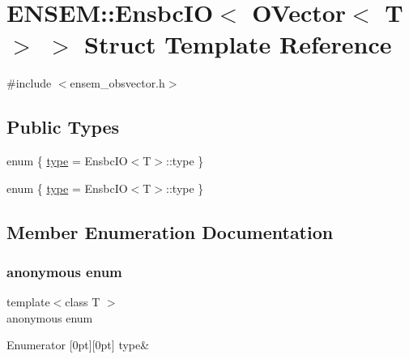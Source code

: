 \hypertarget{structENSEM_1_1EnsbcIO_3_01OVector_3_01T_01_4_01_4}{}\section{E\+N\+S\+EM\+:\+:Ensbc\+IO$<$ O\+Vector$<$ T $>$ $>$ Struct Template Reference}
\label{structENSEM_1_1EnsbcIO_3_01OVector_3_01T_01_4_01_4}


{\ttfamily \#include $<$ensem\+\_\+obsvector.\+h$>$}

\subsection*{Public Types}
\begin{DoxyCompactItemize}
\item 
enum \{ \mbox{\hyperlink{structENSEM_1_1EnsbcIO_3_01OVector_3_01T_01_4_01_4_af687d4373c13ed8655d840312331adc3a5ec4910ef487633a25ec3ae40769fa45}{type}} = Ensbc\+IO$<$T$>$\+:\+:type
 \}
\item 
enum \{ \mbox{\hyperlink{structENSEM_1_1EnsbcIO_3_01OVector_3_01T_01_4_01_4_af687d4373c13ed8655d840312331adc3a5ec4910ef487633a25ec3ae40769fa45}{type}} = Ensbc\+IO$<$T$>$\+:\+:type
 \}
\end{DoxyCompactItemize}


\subsection{Member Enumeration Documentation}
\mbox{\label{structENSEM_1_1EnsbcIO_3_01OVector_3_01T_01_4_01_4_af687d4373c13ed8655d840312331adc3}} 
\subsubsection{\texorpdfstring{anonymous enum}{anonymous enum}}
{\footnotesize\ttfamily template$<$class T $>$ \\
anonymous enum}

\begin{DoxyEnumFields}{Enumerator}
[0pt][0pt]{}\mbox{\label{structENSEM_1_1EnsbcIO_3_01OVector_3_01T_01_4_01_4_af687d4373c13ed8655d840312331adc3a5ec4910ef487633a25ec3ae40769fa45}} 
type&\\
\hline

\end{DoxyEnumFields}
\mbox{\label{structENSEM_1_1EnsbcIO_3_01OVector_3_01T_01_4_01_4_a50a831e2b3394254e373ae71b6941de1}} 
